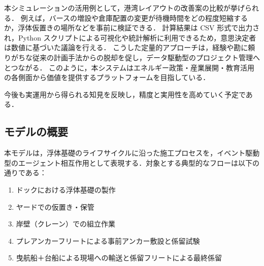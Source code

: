\documentclass[10pt,letterpaper]{jsarticle}
\begin{document}
本シミュレーションの活用例として，港湾レイアウトの改善案の比較が挙げられる．
例えば，バースの増設や倉庫配置の変更が待機時間をどの程度短縮するか，浮体仮置きの場所などを事前に検証できる．
計算結果は CSV 形式で出力され，Python スクリプトによる可視化や統計解析に利用できるため，意思決定者は数値に基づいた議論を行える．
こうした定量的アプローチは，経験や勘に頼りがちな従来の計画手法からの脱却を促し，データ駆動型のプロジェクト管理へとつながる．
このように，本システムはエネルギー政策・産業展開・教育活用の各側面から価値を提供するプラットフォームを目指している．

今後も実運用から得られる知見を反映し，精度と実用性を高めていく予定である．

\subsection{モデルの概要}
本モデルは，浮体基礎のライフサイクルに沿った施工プロセスを，イベント駆動型のエージェント相互作用として表現する．対象とする典型的なフローは以下の通りである：

\begin{enumerate}
  \item ドックにおける浮体基礎の製作
  \item ヤードでの仮置き・保管
  \item 岸壁（クレーン）での組立作業
  \item プレアンカーフリートによる事前アンカー敷設と係留試験
  \item 曳航船＋台船による現場への輸送と係留フリートによる最終係留
\end{enumerate}
\end{document}
